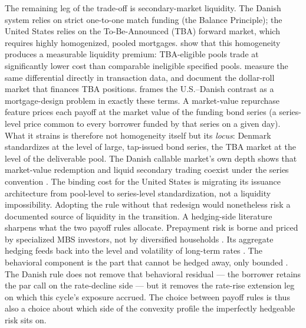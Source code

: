 \documentclass[12pt]{article}
\begin{document}
The remaining leg of the trade-off is secondary-market liquidity. The Danish system relies on strict one-to-one match funding (the Balance Principle); the United States relies on the To-Be-Announced (TBA) forward market, which requires highly homogenized, pooled mortgages. \citet{vickery2013} show that this homogeneity produces a measurable liquidity premium: TBA-eligible pools trade at significantly lower cost than comparable ineligible specified pools. \citet{gao2017} measure the same differential directly in transaction data, and \citet{song2019} document the dollar-roll market that finances TBA positions. \citet{campbell2013} frames the U.S.--Danish contrast as a mortgage-design problem in exactly these terms. A market-value repurchase feature prices each payoff at the market value of the funding bond series (a series-level price common to every borrower funded by that series on a given day). What it strains is therefore not homogeneity itself but its \emph{locus}: Denmark standardizes at the level of large, tap-issued bond series, the TBA market at the level of the deliverable pool. The Danish callable market's own depth shows that market-value redemption and liquid secondary trading coexist under the series convention \citep{berg2018}. The binding cost for the United States is migrating its issuance architecture from pool-level to series-level standardization, not a liquidity impossibility. Adopting the rule without that redesign would nonetheless risk a documented source of liquidity in the transition. A hedging-side literature sharpens what the two payoff rules allocate. Prepayment risk is borne and priced by specialized MBS investors, not by diversified households \citep{gabaix2007}. Its aggregate hedging feeds back into the level and volatility of long-term rates \citep{malkhozov2016}. The behavioral component is the part that cannot be hedged away, only bounded \citep{perotti2024}. The Danish rule does not remove that behavioral residual --- the borrower retains the par call on the rate-decline side --- but it removes the rate-rise extension leg on which this cycle's exposure accrued. The choice between payoff rules is thus also a choice about which side of the convexity profile the imperfectly hedgeable risk sits on.
\end{document}

